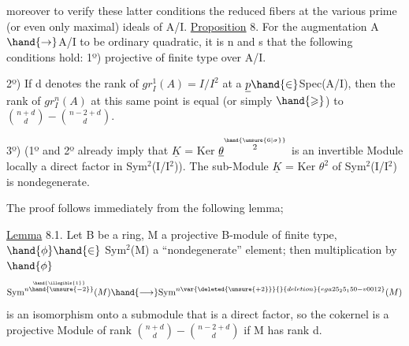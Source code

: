 moreover to verify these latter conditions  the reduced fibers
at the various prime (or even only maximal) ideals of A/I.
\uline{Proposition} 8. For the augmentation A$\hand{\rightarrow}$A/I to be  ordinary
quadratic, it is n and s that the following conditions hold:
1º)   projective of finite type over A/I.

2º) If d denotes the rank of $gr^{1}_{I}(A) = I/I^{2}$ at a $\underline{p} \hand{\in}$Spec(A/I),
then the rank of $gr^{n}_{I}(A)$ at this same point is equal (or simply
$\hand{\geqslant}$) to $\binom{n+d}{d} - \binom{n-2+d}{d}$.

3º) (1º and 2º already imply that $\underline{K}$ = Ker $\underline{\theta}^{\overset{\hand{\unsure{6|\sigma}}}{2}}$ is an invertible
Module locally a direct factor in  Sym$^{2}$(I/I$^{2}$)). The sub-Module
$\underline{K}$ = Ker $\theta^{2}$ of Sym$^{2}$(I/I$^{2}$) is nondegenerate.

The proof follows immediately from the following lemma; 

 \uline{Lemma} 8.1. Let B be a ring, M a projective B-module of
finite type, $\hand{\phi} \hand{\in}$ Sym$^{2}$(M) a ``nondegenerate'' element; then multiplication
by $\hand{\phi}$
\[ \mathrm{Sym}^{\overset{\hand{\illegible{1}}}{n\hand{\unsure{-2}}}}(M) \hand{\longrightarrow} \mathrm{Sym}^{n\var{\deleted{\unsure{+2}}}{}{deletion}{ega25_25_150-v0012}}(M) \]
is an isomorphism onto a submodule that is a direct factor, so the cokernel
is a projective Module of rank $\binom{n+d}{d} - \binom{n-2+d}{d}$ if M has rank d.


